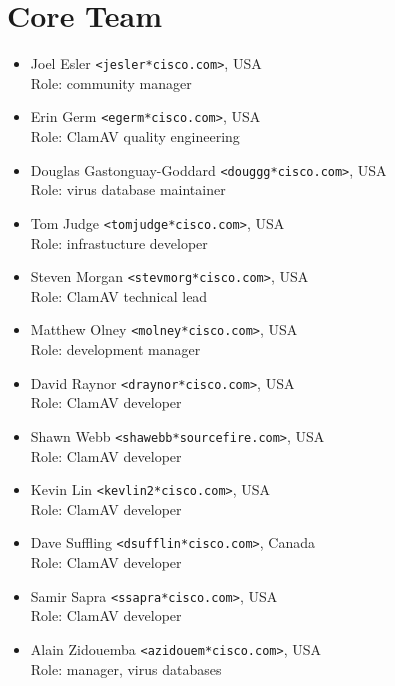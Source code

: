 \documentclass[a4paper,titlepage,12pt]{article}
\newcommand{\email}[1]{\texttt{#1}}
\begin{document}
    \section{Core Team}

    \begin{itemize}
	\item Joel Esler \email{<jesler*cisco.com>}, USA\\
	Role: community manager

	\item Erin Germ \email{<egerm*cisco.com>}, USA\\
	Role: ClamAV quality engineering

	\item Douglas Gastonguay-Goddard \email{<douggg*cisco.com>}, USA\\
	Role: virus database maintainer

	\item Tom Judge \email{<tomjudge*cisco.com>}, USA\\
	Role: infrastucture developer

	\item Steven Morgan \email{<stevmorg*cisco.com>}, USA\\
	Role: ClamAV technical lead

	\item Matthew Olney \email{<molney*cisco.com>}, USA\\
	Role: development manager

	\item David Raynor \email{<draynor*cisco.com>}, USA\\
	Role: ClamAV developer

	\item Shawn Webb \email{<shawebb*sourcefire.com>}, USA\\
	Role: ClamAV developer

	\item Kevin Lin \email{<kevlin2*cisco.com>}, USA\\
	Role: ClamAV developer

	\item Dave Suffling \email{<dsufflin*cisco.com>}, Canada\\
	Role: ClamAV developer

	\item Samir Sapra \email{<ssapra*cisco.com>}, USA\\
	Role: ClamAV developer

	\item Alain Zidouemba \email{<azidouem*cisco.com>}, USA\\
	Role: manager, virus databases
      
    \end{itemize}
\end{document}
